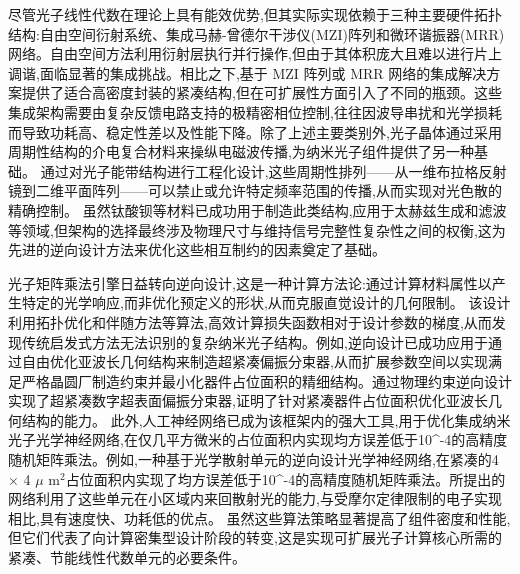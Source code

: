 尽管光子线性代数在理论上具有能效优势,但其实际实现依赖于三种主要硬件拓扑结构:自由空间衍射系统、集成马赫-曾德尔干涉仪(MZI)阵列和微环谐振器(MRR)网络。自由空间方法利用衍射层执行并行操作,但由于其体积庞大且难以进行片上调谐,面临显著的集成挑战。相比之下,基于 MZI 阵列或 MRR 网络的集成解决方案提供了适合高密度封装的紧凑结构,但在可扩展性方面引入了不同的瓶颈。这些集成架构需要由复杂反馈电路支持的极精密相位控制,往往因波导串扰和光学损耗而导致功耗高、稳定性差以及性能下降。除了上述主要类别外,光子晶体通过采用周期性结构的介电复合材料来操纵电磁波传播,为纳米光子组件提供了另一种基础。\citep{doi_10_71465_gmssrj79_3a431fc8} \citep{doi_10_3390_axioms14060445_76ffad4a} 通过对光子能带结构进行工程化设计,这些周期性排列------从一维布拉格反射镜到二维平面阵列------可以禁止或允许特定频率范围的传播,从而实现对光色散的精确控制。\citep{doi_10_4302_plp_v17i4_1361_327bd6c2} \citep{doi_10_1149_ma2026_01231276mtgabs_21448056} 虽然钛酸钡等材料已成功用于制造此类结构,应用于太赫兹生成和滤波等领域,但架构的选择最终涉及物理尺寸与维持信号完整性复杂性之间的权衡,这为先进的逆向设计方法来优化这些相互制约的因素奠定了基础。\citep{doi_10_1088_1402_4896_ae8345_3b948559} \citep{doi_10_1002_adom_202001249_3b8c9743}

光子矩阵乘法引擎日益转向逆向设计,这是一种计算方法论:通过计算材料属性以产生特定的光学响应,而非优化预定义的形状,从而克服直觉设计的几何限制。\citep{doi_10_1364_oe_530479_45946046} \citep{doi_10_1117_12_2649964_b6e13b8f} 该设计利用拓扑优化和伴随方法等算法,高效计算损失函数相对于设计参数的梯度,从而发现传统启发式方法无法识别的复杂纳米光子结构。例如,逆向设计已成功应用于通过自由优化亚波长几何结构来制造超紧凑偏振分束器,从而扩展参数空间以实现满足严格晶圆厂制造约束并最小化器件占位面积的精细结构。通过物理约束逆向设计实现了超紧凑数字超表面偏振分束器,证明了针对紧凑器件占位面积优化亚波长几何结构的能力。\citep{doi_10_3390_app121910064_718c1a26} 此外,人工神经网络已成为该框架内的强大工具,用于优化集成纳米光子光学神经网络,在仅几平方微米的占位面积内实现均方误差低于10\^{}-4的高精度随机矩阵乘法。例如,一种基于光学散射单元的逆向设计光学神经网络,在紧凑的4 \(\times\) 4 \(\mu\) m\(^{2}\)占位面积内实现了均方误差低于10\^{}-4的高精度随机矩阵乘法。所提出的网络利用了这些单元在小区域内来回散射光的能力,与受摩尔定律限制的电子实现相比,具有速度快、功耗低的优点。\citep{doi_10_1016_j_scib_2020_03_042_6b632485} 虽然这些算法策略显著提高了组件密度和性能,但它们代表了向计算密集型设计阶段的转变,这是实现可扩展光子计算核心所需的紧凑、节能线性代数单元的必要条件。\citep{doi_10_1515_nanoph_2020_0379_1cc596ab} \citep{doi_10_3390_app121910064_718c1a26} \citep{doi_10_1016_j_scib_2020_03_042_6b632485}

